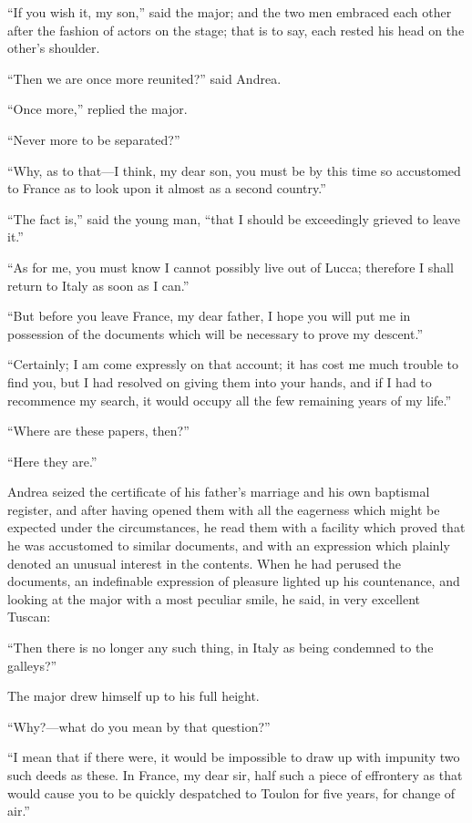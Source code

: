 “If you wish it, my son,” said the major; and the two men embraced each
other after the fashion of actors on the stage; that is to say, each
rested his head on the other’s shoulder.

“Then we are once more reunited?” said Andrea.

“Once more,” replied the major.

“Never more to be separated?”

“Why, as to that—I think, my dear son, you must be by this time so
accustomed to France as to look upon it almost as a second country.”

“The fact is,” said the young man, “that I should be exceedingly
grieved to leave it.”

“As for me, you must know I cannot possibly live out of Lucca;
therefore I shall return to Italy as soon as I can.”

“But before you leave France, my dear father, I hope you will put me in
possession of the documents which will be necessary to prove my
descent.”

“Certainly; I am come expressly on that account; it has cost me much
trouble to find you, but I had resolved on giving them into your hands,
and if I had to recommence my search, it would occupy all the few
remaining years of my life.”

“Where are these papers, then?”

“Here they are.”

Andrea seized the certificate of his father’s marriage and his own
baptismal register, and after having opened them with all the eagerness
which might be expected under the circumstances, he read them with a
facility which proved that he was accustomed to similar documents, and
with an expression which plainly denoted an unusual interest in the
contents. When he had perused the documents, an indefinable expression
of pleasure lighted up his countenance, and looking at the major with a
most peculiar smile, he said, in very excellent Tuscan:

“Then there is no longer any such thing, in Italy as being condemned to
the galleys?”

The major drew himself up to his full height.

“Why?—what do you mean by that question?”

“I mean that if there were, it would be impossible to draw up with
impunity two such deeds as these. In France, my dear sir, half such a
piece of effrontery as that would cause you to be quickly despatched to
Toulon for five years, for change of air.”

